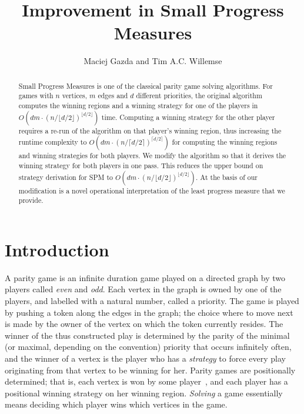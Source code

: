 \documentclass{eptcs}
\title{Improvement in Small Progress Measures}
\author{Maciej Gazda and Tim A.C. Willemse
\institute{Eindhoven University of Technology, The Netherlands}
}
\def\runtimeceil{O(dm \cdot (n/\lceil d / 2 \rceil)^{\lceil d/2 \rceil})}
\def\runtimefloor{O(dm \cdot (n/\lfloor d / 2 \rfloor)^{\lfloor d/2 \rfloor})}
\begin{document}
\maketitle 


\begin{abstract}
Small Progress Measures is one of the classical parity game solving
algorithms. For games with $n$ vertices, $m$ edges and $d$ different
priorities, the original algorithm computes the winning regions and
a winning strategy for one of the players in $\runtimefloor$ time.
Computing a winning strategy for the other player requires a re-run
of the algorithm on that player's winning region, thus increasing
the runtime complexity to $\runtimeceil$ for computing the winning
regions and winning strategies for both players. We modify the
algorithm so that it derives the winning strategy for both players
in one pass. This reduces the upper bound on strategy derivation
for SPM to $\runtimefloor$. At the basis of our modification is a
novel operational interpretation of the least progress measure that
we provide.  \end{abstract}

\section{Introduction}


A parity game \cite{EJ:91,McN:93,Zie:98} is an infinite duration
game played on a directed graph by two players called \emph{even}
and \emph{odd}. Each vertex in the graph is owned by one of the
players, and labelled with a natural number, called a priority.
The game is played by pushing a token along the edges in the graph;
the choice where to move next is made by the owner of the vertex
on which the token currently resides.  The winner of the thus
constructed play is determined by the parity of the minimal (or
maximal, depending on the convention) priority that occurs infinitely
often, and the winner of a vertex is the player who has a \emph{strategy}
to force every play originating from that vertex to be winning for
her.  Parity games are positionally determined; that is, each vertex is won by
some player~\cite{McN:93}, and  each player has a positional winning strategy
on her winning region. \emph{Solving} a game essentially means
deciding which player wins which vertices in the game.
\end{document}
